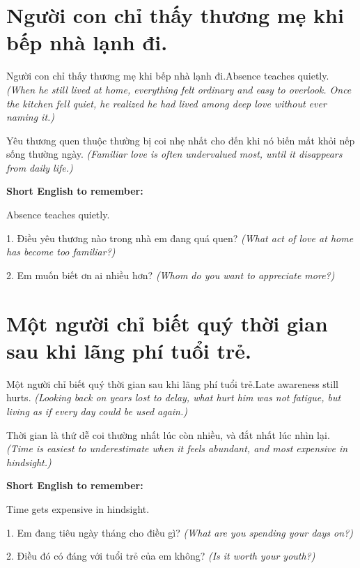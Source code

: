 \section{Người con chỉ thấy thương mẹ khi bếp nhà lạnh đi.}
\begin{truyen}{Người con chỉ thấy thương mẹ khi bếp nhà lạnh đi.}{Absence teaches quietly.}
\textit{(When he still lived at home, everything felt ordinary and easy to overlook. Once the kitchen fell quiet, he realized he had lived among deep love without ever naming it.)}
\end{truyen}
\begin{baihoc}
Yêu thương quen thuộc thường bị coi nhẹ nhất cho đến khi nó biến mất khỏi nếp sống thường ngày.
\textit{(Familiar love is often undervalued most, until it disappears from daily life.)}
\end{baihoc}
\begin{ghinhoanh}\textbf{Short English to remember:}

Absence teaches quietly.
\end{ghinhoanh}
\begin{tuhocnhanh}
1. Điều yêu thương nào trong nhà em đang quá quen? \textit{(What act of love at home has become too familiar?)}

2. Em muốn biết ơn ai nhiều hơn? \textit{(Whom do you want to appreciate more?)}
\end{tuhocnhanh}
\ngancach

\section{Một người chỉ biết quý thời gian sau khi lãng phí tuổi trẻ.}
\begin{truyen}{Một người chỉ biết quý thời gian sau khi lãng phí tuổi trẻ.}{Late awareness still hurts.}
\textit{(Looking back on years lost to delay, what hurt him was not fatigue, but living as if every day could be used again.)}
\end{truyen}
\begin{baihoc}
Thời gian là thứ dễ coi thường nhất lúc còn nhiều, và đắt nhất lúc nhìn lại.
\textit{(Time is easiest to underestimate when it feels abundant, and most expensive in hindsight.)}
\end{baihoc}
\begin{ghinhoanh}\textbf{Short English to remember:}

Time gets expensive in hindsight.
\end{ghinhoanh}
\begin{tuhocnhanh}
1. Em đang tiêu ngày tháng cho điều gì? \textit{(What are you spending your days on?)}

2. Điều đó có đáng với tuổi trẻ của em không? \textit{(Is it worth your youth?)}
\end{tuhocnhanh}
\ngancach

